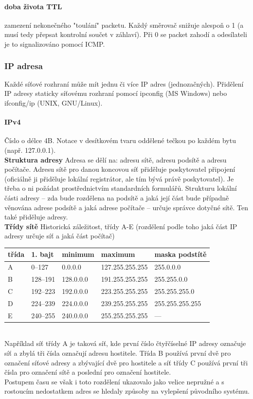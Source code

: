 \documentclass[10pt,a4paper]{article}
\begin{document}
\paragraph{doba života TTL} zamezení nekonečného "toulání" packetu. Každý směrovač snižuje alespoň o 1 (a musí tedy přepsat kontrolní součet v záhlaví). Při 0 se packet zahodí a odesílateli je to signalizováno pomocí ICMP.
\subsubsection{IP adresa} Každé síťové rozhraní může mít jednu či více IP adres (jednozačných). Přidělení IP adresy staticky síťovému rozhraní pomocí ipconfig (MS Windows) nebo ifconfig/ip (UNIX, GNU/Linux).
\paragraph{IPv4}
Číslo o délce 4B. Notace v desítkovém tvaru oddělené tečkou po každém bytu (např. 127.0.0.1). \\
\textbf{Struktura adresy} Adresa se dělí na: adresu sítě, adresu podsítě a adresu počítače. Adresu sítě pro danou koncovou síť přiděluje poskytovatel připojení (oficiálně ji přiděluje lokální registrátor, ale tím bývá právě poskytovatel). Je třeba o ni požádat prostřednictvím standardních formulářů. Strukturu lokální části adresy – zda bude rozdělena na podsítě a jaká její část bude případně věnována adrese podsítě a jaká adrese počítače – určuje správce dotyčné sítě. Ten také přiděluje adresy. \\
\textbf{Třídy sítě} Historická záležitost, třídy A-E (rozdělení podle toho jaká část IP adresy určuje síť a jaká část počítač) \\
\begin{tabular}{| l | l | l | l | l |}
\hline
třída & 1. bajt & minimum & maximum& maska podstítě \\ \hline
A & 0–127 & 0.0.0.0 & 127.255.255.255 & 255.0.0.0 \\ \hline
B & 128–191 & 128.0.0.0 & 191.255.255.255 & 255.255.0.0 \\ \hline
C & 192–223 & 192.0.0.0 & 223.255.255.255 & 255.255.255.0 \\ \hline
D & 224–239 & 224.0.0.0 & 239.255.255.255 & 255.255.255.255 \\ \hline
E & 240–255 & 240.0.0.0 & 255.255.255.255 & — \\ \hline
\end{tabular} \\
Například síť třídy A je taková síť, kde první číslo čtyřčíselné IP adresy označuje síť a zbylá tři čísla označují adresu hostitele. Třída B používá první dvě pro označení síťové adresy a zbývající dvě pro hostitele a síť třídy C používá první tři čísla pro označení sítě a poslední pro označení hostitele. \\
Postupem času se však i toto rozdělení ukazovalo jako velice nepružné a s rostoucím nedostatkem adres se hledaly způsoby na vylepšení původního systému.
\end{document}
